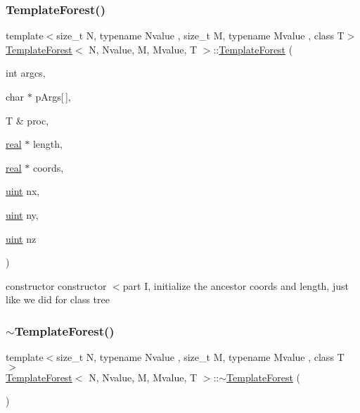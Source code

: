 \subsubsection{\texorpdfstring{Template\+Forest()}{TemplateForest()}\hspace{0.1cm}{\footnotesize\ttfamily [2/2]}}
{\footnotesize\ttfamily template$<$size\+\_\+t N, typename Nvalue , size\+\_\+t M, typename Mvalue , class T$>$ \\
\mbox{\hyperlink{classTemplateForest}{Template\+Forest}}$<$ N, Nvalue, M, Mvalue, T $>$\+::\mbox{\hyperlink{classTemplateForest}{Template\+Forest}} (\begin{DoxyParamCaption}\item[{int}]{argcs,  }\item[{char $\ast$}]{p\+Args\mbox{[}$\,$\mbox{]},  }\item[{T \&}]{proc,  }\item[{\mbox{\hyperlink{definitions_8h_aedc0ad84d1e764530814f57ad931d02a}{real}} $\ast$}]{length,  }\item[{\mbox{\hyperlink{definitions_8h_aedc0ad84d1e764530814f57ad931d02a}{real}} $\ast$}]{coords,  }\item[{\mbox{\hyperlink{definitions_8h_a69aa29b598b851b0640aa225a9e5d61d}{uint}}}]{nx,  }\item[{\mbox{\hyperlink{definitions_8h_a69aa29b598b851b0640aa225a9e5d61d}{uint}}}]{ny,  }\item[{\mbox{\hyperlink{definitions_8h_a69aa29b598b851b0640aa225a9e5d61d}{uint}}}]{nz }\end{DoxyParamCaption})}

constructor constructor $<$part I, initialize the ancestor coords and length, just like we did for class tree \mbox{\label{classTemplateForest_a65c47765d20e839f0cb08b2119b628da}} 
\subsubsection{\texorpdfstring{$\sim$\+Template\+Forest()}{~TemplateForest()}}
{\footnotesize\ttfamily template$<$size\+\_\+t N, typename Nvalue , size\+\_\+t M, typename Mvalue , class T $>$ \\
\mbox{\hyperlink{classTemplateForest}{Template\+Forest}}$<$ N, Nvalue, M, Mvalue, T $>$\+::$\sim$\mbox{\hyperlink{classTemplateForest}{Template\+Forest}} (\begin{DoxyParamCaption}{ }\end{DoxyParamCaption})}

